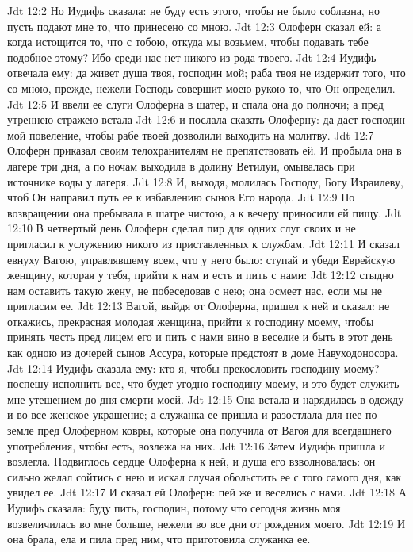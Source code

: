 \vs Jdt 12:2 Но Иудифь сказала: не буду есть этого, чтобы не было соблазна, но пусть подают мне то, что принесено со мною.
\vs Jdt 12:3 Олоферн сказал ей: а когда истощится то, что с тобою, откуда мы возьмем, чтобы подавать тебе подобное этому? Ибо среди нас нет никого из рода твоего.
\vs Jdt 12:4 Иудифь отвечала ему: да живет душа твоя, господин мой; раба твоя не издержит того, что со мною, прежде, нежели Господь совершит моею рукою то, что Он определил.
\vs Jdt 12:5 И ввели ее слуги Олоферна в шатер, и спала она до полночи; а пред утреннею стражею встала
\vs Jdt 12:6 и послала сказать Олоферну: да даст господин мой повеление, чтобы рабе твоей дозволили выходить на молитву.
\vs Jdt 12:7 Олоферн приказал своим телохранителям не препятствовать ей. И пробыла она в лагере три дня, а по ночам выходила в долину Ветилуи, омывалась при источнике воды у лагеря.
\vs Jdt 12:8 И, выходя, молилась Господу, Богу Израилеву, чтоб Он направил путь ее к избавлению сынов Его народа.
\vs Jdt 12:9 По возвращении она пребывала в шатре чистою, а к вечеру приносили ей пищу.
\vs Jdt 12:10 В четвертый день Олоферн сделал пир для одних слуг своих и не пригласил к услужению никого из приставленных к службам.
\vs Jdt 12:11 И сказал евнуху Вагою, управлявшему всем, что у него было: ступай и убеди Еврейскую женщину, которая у тебя, прийти к нам и есть и пить с нами:
\vs Jdt 12:12 стыдно нам оставить такую жену, не побеседовав с нею; она осмеет нас, если мы не пригласим ее.
\vs Jdt 12:13 Вагой, выйдя от Олоферна, пришел к ней и сказал: не откажись, прекрасная молодая женщина, прийти к господину моему, чтобы принять честь пред лицем его и пить с нами вино в веселие и быть в этот день как одною из дочерей сынов Ассура, которые предстоят в доме Навуходоносора.
\vs Jdt 12:14 Иудифь сказала ему: кто я, чтобы прекословить господину моему? поспешу исполнить все, что будет угодно господину моему, и это будет служить мне утешением до дня смерти моей.
\vs Jdt 12:15 Она встала и нарядилась в одежду и во все женское украшение; а служанка ее пришла и разостлала для нее по земле пред Олоферном ковры, которые она получила от Вагоя для всегдашнего употребления, чтобы есть, возлежа на них.
\vs Jdt 12:16 Затем Иудифь пришла и возлегла. Подвиглось сердце Олоферна к ней, и душа его взволновалась: он сильно желал сойтись с нею и искал случая обольстить ее с того самого дня, как увидел ее.
\vs Jdt 12:17 И сказал ей Олоферн: пей же и веселись с нами.
\vs Jdt 12:18 А Иудифь сказала: буду пить, господин, потому что сегодня жизнь моя возвеличилась во мне больше, нежели во все дни от рождения моего.
\vs Jdt 12:19 И она брала, ела и пила пред ним, что приготовила служанка ее.
